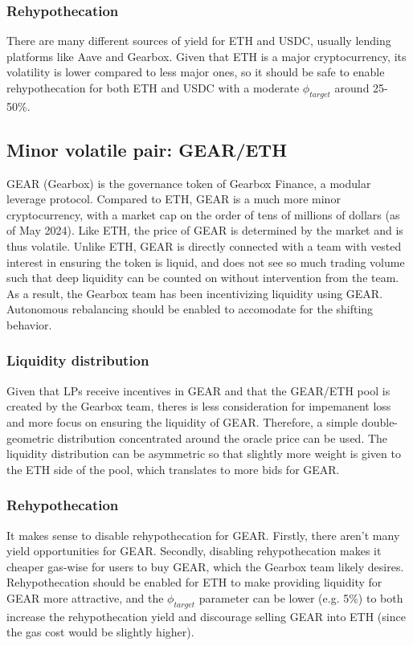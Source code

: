 \documentclass[twocolumn]{article}
\begin{document}
\subsubsection{Rehypothecation}

There are many different sources of yield for ETH and USDC, usually lending platforms like Aave and Gearbox. Given that ETH is a major cryptocurrency, its volatility is lower compared to less major ones, so it should be safe to enable rehypothecation for both ETH and USDC with a moderate $\phi_{target}$ around 25-50\%.

\subsection{Minor volatile pair: GEAR/ETH}

GEAR (Gearbox)\cite{Gearbox} is the governance token of Gearbox Finance, a modular leverage protocol. Compared to ETH, GEAR is a much more minor cryptocurrency, with a market cap on the order of tens of millions of dollars (as of May 2024). Like ETH, the price of GEAR is determined by the market and is thus volatile. Unlike ETH, GEAR is directly connected with a team with vested interest in ensuring the token is liquid, and does not see so much trading volume such that deep liquidity can be counted on without intervention from the team. As a result, the Gearbox team has been incentivizing liquidity using GEAR. Autonomous rebalancing should be enabled to accomodate for the shifting behavior.

\subsubsection{Liquidity distribution}

Given that LPs receive incentives in GEAR and that the GEAR/ETH pool is created by the Gearbox team, theres is less consideration for impemanent loss and more focus on ensuring the liquidity of GEAR. Therefore, a simple double-geometric distribution concentrated around the oracle price can be used. The liquidity distribution can be asymmetric so that slightly more weight is given to the ETH side of the pool, which translates to more bids for GEAR.  

\subsubsection{Rehypothecation}

It makes sense to disable rehypothecation for GEAR. Firstly, there aren't many yield opportunities for GEAR. Secondly, disabling rehypothecation makes it cheaper gas-wise for users to buy GEAR, which the Gearbox team likely desires. Rehypothecation should be enabled for ETH to make providing liquidity for GEAR more attractive, and the $\phi_{target}$ parameter can be lower (e.g. 5\%) to both increase the rehypothecation yield and discourage selling GEAR into ETH (since the gas cost would be slightly higher).
\end{document}
